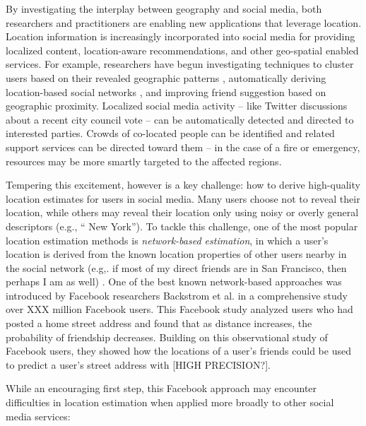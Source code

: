 \documentclass[letterpaper]{article}
\begin{document}
By investigating the interplay between geography and social media, both researchers and practitioners are enabling new applications that leverage location. Location information is increasingly incorporated into social media for providing localized content, location-aware recommendations, and other geo-spatial enabled services. For example, researchers have begun investigating techniques to cluster users based on their revealed geographic patterns \cite{ADD CITE}, automatically deriving location-based social networks \cite{ADD CITE}, and improving friend suggestion based on geographic proximity. Localized social media activity -- like Twitter discussions about a recent city council vote -- can be automatically detected and directed to interested parties. Crowds of co-located people can be identified and related support services can be directed toward them -- in the case of a fire or emergency, resources may be more smartly targeted to the affected regions. 

Tempering this excitement, however is a key challenge: how to derive high-quality location estimates for users in social media. Many users choose not to reveal their location, while others may reveal their location only using noisy or overly general descriptors (e.g., `` New York'').  To tackle this challenge, one of the most popular location estimation methods is \textit{network-based estimation}, in which a user's location is derived from the known location  properties of other users nearby in the social network (e.g,. if most of my direct friends are in San Francisco, then perhaps I am as well) \cite{ADD CITESHERE}. One of the best known network-based approaches was introduced by Facebook researchers Backstrom et al. \cite{backstrom2010find} in a comprehensive study over XXX million Facebook users. This Facebook study analyzed users who had posted a home street address and found that as distance increases, the probability of friendship decreases. Building on this observational study of Facebook users, they showed how the locations of a user's friends could be used to predict a user's street address with [HIGH PRECISION?]. 

While an encouraging first step, this Facebook approach may encounter difficulties in location estimation when applied more broadly to other social media services: 
\end{document}
